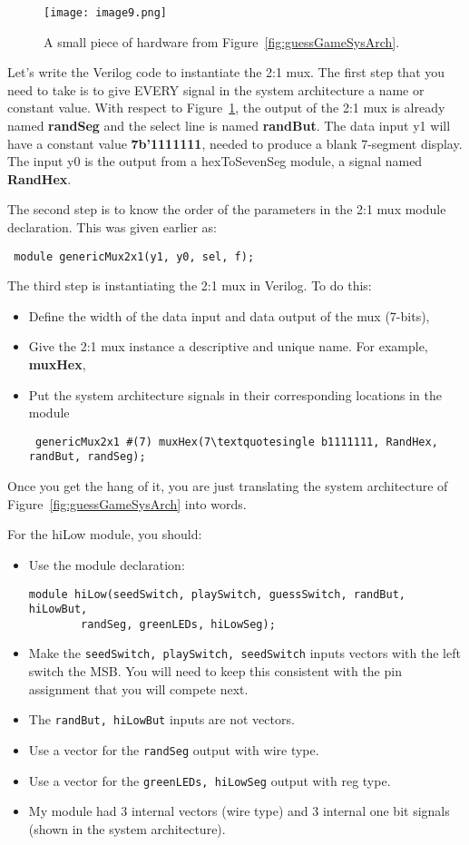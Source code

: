 \begin{figure}[ht]
\texttt{[image: image9.png]}
\caption{A small piece of hardware from Figure~\ref{fig:guessGameSysArch}.}
\label{fig:snippetFromSysArch}
\end{figure}


Let's write the Verilog code to instantiate the 2:1 mux.
The first step that you need to take is to give EVERY signal in the
system architecture a name or constant value. With respect to Figure~\ref{fig:snippetFromSysArch},
the output of the 2:1 mux is already named \textbf{randSeg} and the
select line is named \textbf{randBut}. The data input y1 will have a
constant value \textbf{7b'1111111}, needed to produce a blank 7-segment
display. The input y0 is the output from a hexToSevenSeg module, a signal 
named \textbf{RandHex}.

The second step is to know the order of the parameters in the 2:1 mux
module declaration. This was given earlier as:

\verb+ module genericMux2x1(y1, y0, sel, f); +


The third step is instantiating the 2:1 mux in Verilog. To do this:

\begin{itemize}
\item
  Define the width of the data input and data output of the mux
  (7-bits),
\item
  Give the 2:1 mux instance a descriptive and unique name. 
  For example, \textbf{muxHex},
\item
  Put the system architecture signals in their corresponding locations
  in the module

\verb+ genericMux2x1 #(7) muxHex(7\textquotesingle b1111111, RandHex, randBut, randSeg); +
\end{itemize}

Once you get the hang of it, you are just translating the system
architecture of Figure~\ref{fig:guessGameSysArch} into words.

For the hiLow module, you should:

\begin{itemize}
\item
  Use the module declaration:

\begin{verbatim}
module hiLow(seedSwitch, playSwitch, guessSwitch, randBut, hiLowBut,
		randSeg, greenLEDs, hiLowSeg); 
\end{verbatim}

\item
  Make the \verb+seedSwitch, playSwitch, seedSwitch+ inputs vectors with the
  left switch the MSB. You will need to keep this consistent with the
  pin assignment that you will compete next.
\item
  The \verb+randBut, hiLowBut+ inputs are not vectors.
\item
  Use a vector for the \verb+randSeg+ output with wire type.
\item
  Use a vector for the \verb+greenLEDs, hiLowSeg+ output with reg type.
\item
  My module had 3 internal vectors (wire type) and 3 internal one bit
  signals (shown in the system architecture).
\end{itemize}

